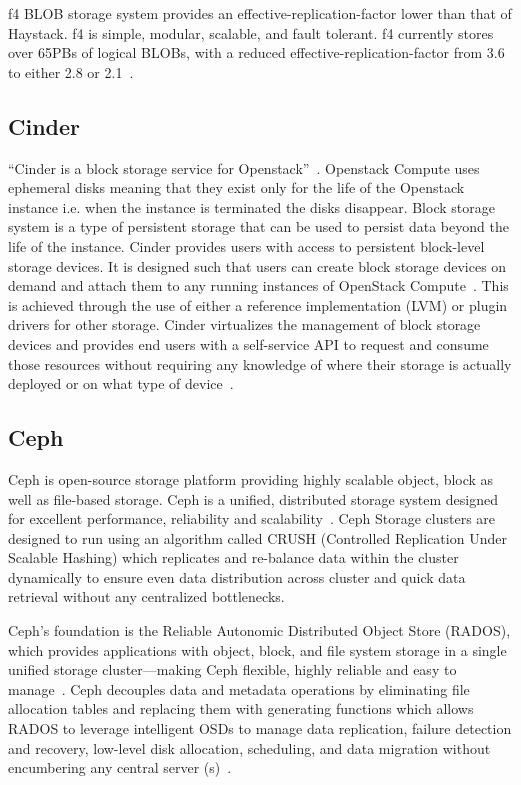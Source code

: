      f4 BLOB storage system provides an effective-replication-factor
     lower than that of Haystack. f4 is simple, modular, scalable, and
     fault tolerant. f4 currently stores over 65PBs of logical BLOBs,
     with a reduced effective-replication-factor from 3.6 to either
     2.8 or 2.1~\cite{paper-f4}.

     
\subsection{Cinder}
      
``Cinder is a block storage service for
Openstack''~\cite{wiki-Cinder}. Openstack Compute uses ephemeral disks
meaning that they exist only for the life of the Openstack instance
i.e. when the instance is terminated the disks disappear. Block
storage system is a type of persistent storage that can be used to
persist data beyond the life of the instance. Cinder provides users
with access to persistent block-level storage devices. It is designed
such that users can create block storage devices on demand and attach
them to any running instances of OpenStack
Compute~\cite{book-Cinder}. This is achieved through the use of either
a reference implementation (LVM) or plugin drivers for other
storage. Cinder virtualizes the management of block storage devices
and provides end users with a self-service API to request and consume
those resources without requiring any knowledge of where their storage
is actually deployed or on what type of device~\cite{wiki-Cinder}.
     
\subsection{Ceph }

Ceph is open-source storage platform providing highly scalable object,
block as well as file-based storage. Ceph is a unified, distributed
storage system designed for excellent performance, reliability and
scalability~\cite{www-ceph}. Ceph Storage clusters are designed to run
using an algorithm called CRUSH (Controlled Replication Under Scalable
Hashing) which replicates and re-balance data within the cluster
dynamically to ensure even data distribution across cluster and quick
data retrieval without any centralized bottlenecks.
 
Ceph’s foundation is the Reliable Autonomic Distributed Object Store
(RADOS), which provides applications with object, block, and file
system storage in a single unified storage cluster—making Ceph
flexible, highly reliable and easy to manage~\cite{www-cepharch}. Ceph
decouples data and metadata operations by eliminating file allocation
tables and replacing them with generating functions which allows RADOS
to leverage intelligent OSDs to manage data replication, failure
detection and recovery, low-level disk allocation, scheduling, and
data migration without encumbering any central server
(s)~\cite{paper-Ceph}.
 
